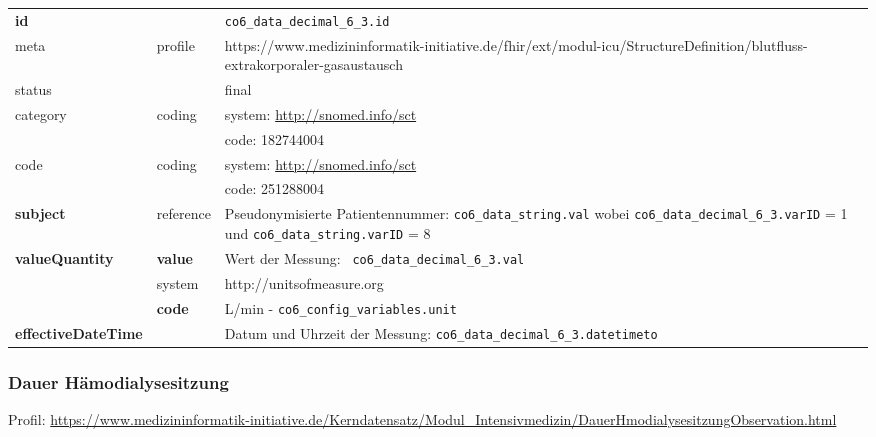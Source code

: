 \begin{longtable}{|l|l|p{7.5cm}|}
	\hline
	\rowcolor{lightgray} \multicolumn{3}{|l|}{Data Mapping (inhaltlich)} \\ \hline
	\textbf{id} &  & \texttt{co6\_data\_decimal\_6\_3.id} \\ \hline
	meta & profile & https://www.medizininformatik-initiative.de/fhir/ext/modul-icu/StructureDefinition/blutfluss-extrakorporaler-gasaustausch \\ \hline 
	status &  & final   \\ \hline 
	category & coding & system: \url{http://snomed.info/sct} \\
	\cline{3-3}
	& & code: 182744004 \\ \hline
	code & coding & system: \url{http://snomed.info/sct} \\ 
	\cline{3-3} 
	&  & code: 251288004 \\ \hline
	\textbf{subject} & reference & Pseudonymisierte Patientennummer: \texttt{co6\_data\_string.val} wobei \texttt{co6\_data\_decimal\_6\_3.varID} = 1 und \texttt{co6\_data\_string.varID} = 8 \\ \hline
	\textbf{valueQuantity}  & \textbf{value} & Wert der Messung: \texttt{
		co6\_data\_decimal\_6\_3.val} \\
	\cline{2-3}
	& system & http://unitsofmeasure.org \\
	\cline{2-3}
	& \textbf{code} & L/min - \texttt{co6\_config\_variables.unit}
	\\ \hline
	\textbf{effectiveDateTime}  & & Datum und Uhrzeit der Messung: \texttt{co6\_data\_decimal\_6\_3.datetimeto} \\
	\hline
\end{longtable}

\subsubsection{Dauer Hämodialysesitzung} 

Profil: \url{https://www.medizininformatik-initiative.de/Kerndatensatz/Modul_Intensivmedizin/DauerHmodialysesitzungObservation.html}

